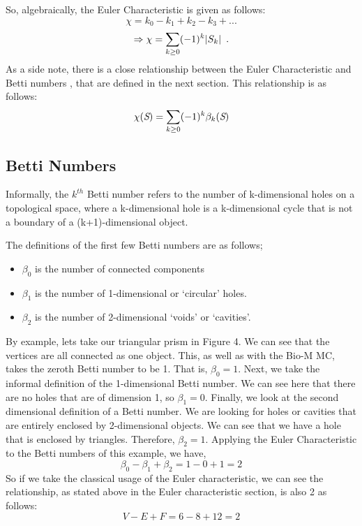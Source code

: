 So, algebraically, the Euler Characteristic is given as follows:
\begin{equation*}
    \chi = k_0 - k_1 + k_2 - k_3 + ... 
\end{equation*}
\begin{equation}
    \Rightarrow \chi = \sum_{k \geq 0} (-1)^k \abs{S_k} \enspace{.} 
\end{equation}
As a side note, there is a close relationship between the Euler Characteristic and Betti numbers \cite{Reimann_2017}, that are defined in the next section. This relationship is as follows:
\begin{equation}
    \chi(\emph{S}) = \sum_{k\geq 0}(-1)^k \beta_{k}(\emph{S})
\end{equation}


\subsection{Betti Numbers}
Informally, the $k^{th}$ Betti number refers to the number of k-dimensional holes on a topological space, where a k-dimensional hole is a k-dimensional cycle that is not a boundary of a (k+1)-dimensional object. 

The definitions of the first few Betti numbers are as follows;
\begin{itemize}
    \item $\beta_0$ is the number of connected components
    \item $\beta_1$ is the number of 1-dimensional or `circular' holes.
    \item $\beta_2$ is the number of 2-dimensional `voids' or `cavities'.
\end{itemize}
By example, lets take our triangular prism in Figure 4. We can see that the vertices are all connected as one object. This, as well as with the Bio-M MC, takes the zeroth Betti number to be 1. That is, $\beta_0 = 1$. Next, we take the informal definition of the 1-dimensional Betti number. We can see here that there are no holes that are of dimension 1, so $\beta_1 = 0$. Finally, we look at the second dimensional definition of a Betti number. We are looking for holes or cavities that are entirely enclosed by 2-dimensional objects. We can see that we have a hole that is enclosed by triangles. Therefore, $\beta_2 = 1$. Applying the Euler Characteristic to the Betti numbers of this example, we have,
\begin{equation}
    \beta_0 - \beta_1 + \beta_2 = 1 - 0 + 1 = 2
\end{equation}
So if we take the classical usage of the Euler characteristic, we can see the relationship, as stated above in the Euler characteristic section, is also 2 as follows:
\begin{equation}
    V - E + F = 6 - 8 + 12 = 2
\end{equation}

